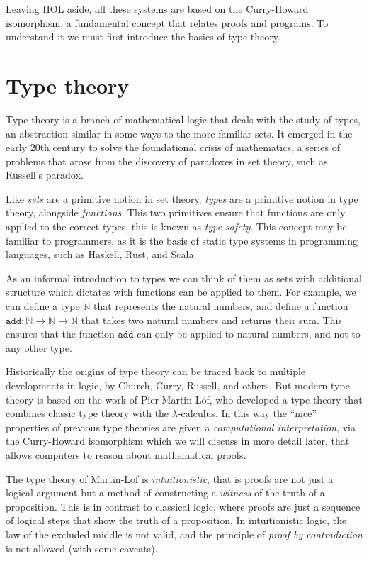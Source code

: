 \documentclass[
  a4paper, 
  10pt, 
  parskip=half, 
  DIV=20,
  toc=bibliography,
  usegeometry,
]{scrartcl}
\begin{document}
Leaving HOL aside, all these systems are based on the Curry-Howard isomorphism,
a fundamental concept that relates proofs and programs. To understand it we must
first introduce the basics of type theory.

\section{Type theory}

Type theory is a branch of mathematical logic that deals with the study of
types, an abstraction similar in some ways to the more familiar sets.
It emerged in the early 20th century to solve the foundational crisis of
mathematics, a series of problems that arose from the discovery of paradoxes in
set theory, such as Russell's paradox.

Like \emph{sets} are a primitive notion in set theory, \emph{types} are a primitive notion
in type theory, alongside \emph{functions}. This two primitives ensure that functions
are only applied to the correct types, this is known as \emph{type safety}. This
concept may be familiar to programmers, as it is the basis of static type
systems in programming languages, such as Haskell, Rust, and Scala.

As an informal introduction to types we can think of them as sets with
additional structure which dictates with functions can be applied to them. For
example, we can define a type \(\mathbb{N}\) that represents the natural numbers,
and define a function \(\texttt{add}: \mathbb{N} \to \mathbb{N} \to \mathbb{N}\)
that takes two natural numbers and returns their sum. This ensures that the
function \(\texttt{add}\) can only be applied to natural numbers, and not to any
other type.

Historically the origins of type theory can be traced back to multiple 
developments in logic, by Church, Curry, Russell, and others. But modern type
theory is based on the work of Pier Martin-Löf, who developed a type theory that
combines classic type theory with the \(\lambda\)-calculus. In this way
the \enquote{nice} properties of previous type theories are given a 
\emph{computational interpretation}, via the Curry-Howard isomorphism which
we will discuss in more detail later, that allows computers to reason about
mathematical proofs.

The type theory of Martin-Löf is \emph{intuitionistic}, that is
proofs are not just a logical argument but a method of constructing a
\emph{witness} of the truth of a proposition. This is in contrast to classical
logic, where proofs are just a sequence of logical steps that show the truth of a
proposition. In intuitionistic logic, the law of the excluded middle is not
valid, and the principle of \emph{proof by contradiction} is not allowed (with
some caveats).
\end{document}

